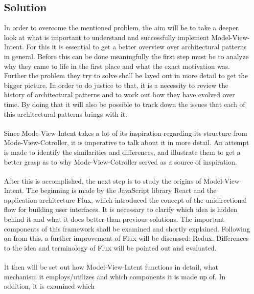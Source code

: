 \subsection{Solution}
\label{subsec:solution}


In order to overcome the mentioned problem, the aim will be to take a deeper look at what is important to understand and successfully implement Model-View-Intent.
For this it is essential to get a better overview over architectural patterns in general. Before this can be done meaningfully the first step must be 
to analyze why they came to life in the first place and what the exact motivation was. Further the problem they try to solve shall be layed out in more detail to 
get the bigger picture. In order to do justice to that, it is a necessity to review the history of architectural patterns and to work out how they have evolved over time.
By doing that it will also be possible to track down the issues that each of this architectural patterns brings with it.
\\
\\
Since Mode-View-Intent takes a lot of its inspiration regarding its structure from Mode-View-Cotroller, it is imperative to talk about it in more detail.
An attempt is made to identify the similarities and differences, and illustrate them to get a better grasp as to why Mode-View-Cotroller served as a source of inspiration.
\\
\\
After this is accomplished, the next step is to study the origins of Model-View-Intent. The beginning is made by the JavaScript library React and the application architecture
Flux, which introduced the concept of the unidirectional flow for building user interfaces. It is necessary to clarify which idea is hidden behind it and what it does
better than previous solutions. The important components of this framework shall be examined and shortly explained. Following on from this, a further improvement of Flux will 
be discussed: Redux. Differences to the idea and terminology of Flux will be pointed out and evaluated.
\\
\\
It then will be set out how Model-View-Intent functions in detail, what mechanism it employs/utilizes and which components it is made up of. In addition, it is examined which 
